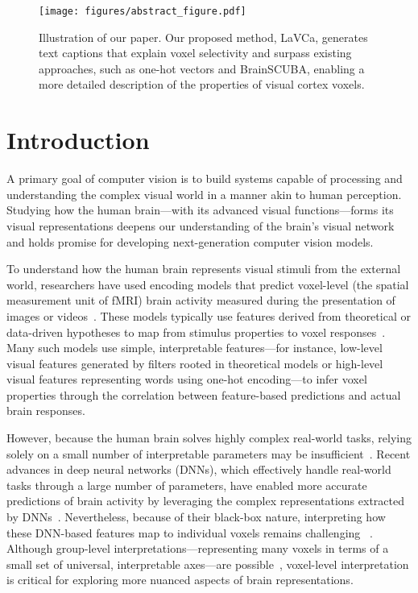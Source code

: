 
\begin{figure*}[t] %
  \texttt{[image: figures/abstract\_figure.pdf]}
  \vskip 0.1in %
  \caption{Illustration of our paper. Our proposed method, LaVCa, generates text captions that explain voxel selectivity and surpass existing approaches, such as one-hot vectors and BrainSCUBA, enabling a more detailed description of the properties of visual cortex voxels.
}
  \label{abstract:abstract_figure}
\end{figure*}

\section{Introduction}
A primary goal of computer vision is to build systems capable of processing and understanding the complex visual world in a manner akin to human perception. Studying how the human brain—with its advanced visual functions—forms its visual representations deepens our understanding of the brain’s visual network and holds promise for developing next-generation computer vision models.

To understand how the human brain represents visual stimuli from the external world, researchers have used encoding models that predict voxel-level (the spatial measurement unit of fMRI) brain activity measured during the presentation of images or videos~\cite{naselaris2011encoding}. These models typically use features derived from theoretical or data-driven hypotheses to map from stimulus properties to voxel responses~\cite{kay2008identifying, nishimoto2011reconstructing, naselaris2011encoding, huth2012continuous}. Many such models use simple, interpretable features—for instance, low-level visual features generated by filters rooted in theoretical models or high-level visual features representing words using one-hot encoding—to infer voxel properties through the correlation between feature-based predictions and actual brain responses.

However, because the human brain solves highly complex real-world tasks, relying solely on a small number of interpretable parameters may be insufficient~\cite{kriegeskorte2018cognitive}. Recent advances in deep neural networks (DNNs), which effectively handle real-world tasks through a large number of parameters, have enabled more accurate predictions of brain activity by leveraging the complex representations extracted by DNNs~\cite{gucclu2015deep, schrimpf2021neural, takagi2023high, denk2023brain2music, antonello2024scaling}. Nevertheless, because of their black-box nature, interpreting how these DNN-based features map to individual voxels remains challenging ~\cite{abnar2019blackbox}. Although group-level interpretations—representing many voxels in terms of a small set of universal, interpretable axes—are possible~\cite{huth2016natural, lescroart2019human, nakagi2024unveiling}, voxel-level interpretation is critical for exploring more nuanced aspects of brain representations.

